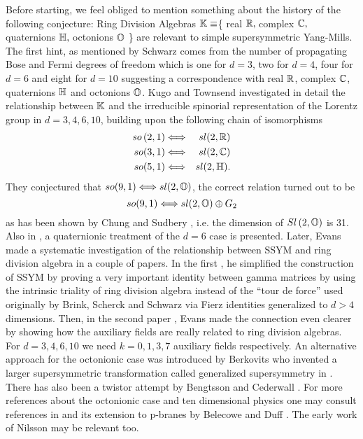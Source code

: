 \documentclass[a4paper,12pt]{book}
\begin{document}
Before starting, we feel obliged to mention something about the history of
the following conjecture: Ring Division Algebras $\Bbb{K}\equiv $\{ real $%
\Bbb{R},\;$complex $\Bbb{C},\;$quaternions $\Bbb{H},\;$octonions $\Bbb{O}$
\} are relevant to simple supersymmetric Yang-Mills. The first hint, as
mentioned by Schwarz \cite{r1} comes from the number of propagating Bose and
Fermi degrees of freedom which is one for $d=3$, two for $d=4$, four for $%
d=6 $ and eight for $d=10$ suggesting a correspondence with real $\Bbb{R}$,
complex $\Bbb{C}$, quaternions $\Bbb{H}$ and octonions $\Bbb{O}$. Kugo and
Townsend \cite{r2} investigated in detail the relationship between $\Bbb{K}$
and the irreducible spinorial representation of the Lorentz group in $%
d=3,4,6,10$, building upon the following chain of isomorphisms 
\begin{eqnarray*}
so\left( 2,1\right) &\Longleftrightarrow &sl(2,\Bbb{R}) \\
so(3,1) &\Longleftrightarrow &sl(2,\Bbb{C}) \\
so(5,1) &\Longleftrightarrow &sl(2,\Bbb{H}).
\end{eqnarray*}
They conjectured that $so(9,1)\Longleftrightarrow sl(2,\Bbb{O})$, the
correct relation turned out to be 
\[
so(9,1)\Longleftrightarrow sl(2,\Bbb{O})\oplus G_{2} 
\]
as has been shown by Chung and Sudbery \cite{r3}, i.e. the dimension of $%
Sl\left( 2,\Bbb{O}\right) $ is 31. Also in \cite{r2}, a quaternionic
treatment of the $d=6$ case is presented. Later, Evans made a systematic
investigation of the relationship between SSYM and ring division algebra in
a couple of papers. In the first \cite{r4}, he simplified the construction
of SSYM by proving a very important identity between gamma matrices by using
the intrinsic triality of ring division algebra instead of the ``tour de
force'' used originally by Brink, Scherck and Schwarz \cite{r0} via Fierz
identities generalized to $d>4$ dimensions. Then, in the second paper \cite
{r6}, Evans made the connection even clearer by showing how the auxiliary
fields are really related to ring division algebras. For $d=3,4,6,10$ we
need $k=0,1,3,7$ auxiliary fields respectively. An alternative approach for
the octonionic case was introduced by Berkovits \cite{r7} who invented a
larger supersymmetric transformation called generalized supersymmetry in 
\cite{r8}. There has also been a twistor attempt by Bengtsson and Cederwall 
\cite{r9}. For more references about the octonionic case and ten dimensional
physics one may consult references in \cite{r10} and its extension to
p-branes by Belecowe and Duff \cite{r11}. The early work of Nilsson may be
relevant \cite{r12}\cite{r13} too.
\end{document}
